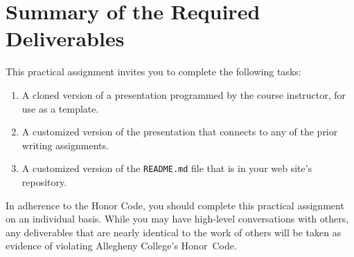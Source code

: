 \vspace*{-.175in}
\section*{Summary of the Required Deliverables}

This practical assignment invites you to complete the following tasks:

\vspace*{-.1in}
\begin{enumerate}
  \setlength{\itemsep}{0in}

  \item A cloned version of a presentation programmed by the course instructor, for use as a template.
  \item A customized version of the presentation that connects to any of the prior writing assignments.
  \item A customized version of the {\tt README.md} file that is in your web site's repository.

\end{enumerate}
\vspace*{-.1in}

In adherence to the Honor Code, you should complete this practical assignment on an individual basis. While you may have
high-level conversations with others, any deliverables that are nearly identical to the work of others will be taken as
evidence of violating Allegheny College's \mbox{Honor Code}.


